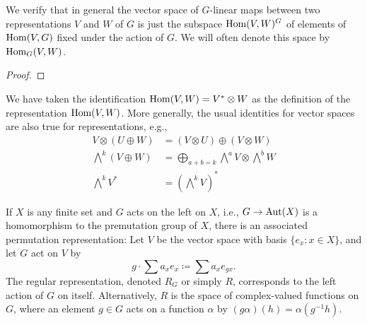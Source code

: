 \begin{exercise}
We verify that in general the vector space of $G$-linear maps between two
representations $V$ and $W$ of $G$ is just the subspace $\operatorname{Hom}(V,W)^G$ of
elements of $\operatorname{Hom}(V,G)$ fixed under the action of $G$. We will often denote
this space by $\operatorname{Hom}_G(V,W)$.
\end{exercise}
\begin{proof}
\end{proof}

We have taken the identification $\operatorname{Hom}(V,W)=V^*\otimes W$ as the
definition of the representation $\operatorname{Hom}(V,W)$. More generally, the usual
identities for vector spaces are also true for representations, e.g.,
\begin{align*}
V\otimes(U\oplus W)&=(V\otimes U)\oplus(V\otimes W)\\
\bigwedge^k(V\oplus W)&=\bigoplus_{a+b=k}{\textstyle\bigwedge^a V\otimes\bigwedge^b
  W}\\
{\textstyle\bigwedge^k V^*}&=\left({\textstyle{\bigwedge^kV}}\right)^*
\end{align*}

If $X$ is any finite set and $G$ acts on the left on $X$, i.e.,
$G\to\operatorname{Aut}(X)$ is a homomorphism to the premutation group of $X$, there is
an associated permutation representation: Let $V$ be the vector space with
basis $\{e_x:x\in X\}$, and let $G$ act on $V$ by
\[
  g\cdot\sum a_xe_x\coloneqq\sum a_xe_{gx}.
\]
The regular representation, denoted $R_G$ or simply $R$, corresponds to the
left action of $G$ on itself. Alternatively, $R$ is the space of
complex-valued functions on $G$, where an element $g\in G$ acts on a
function $\alpha$ by $(g\alpha)(h)=\alpha(g^{-1}h)$.

